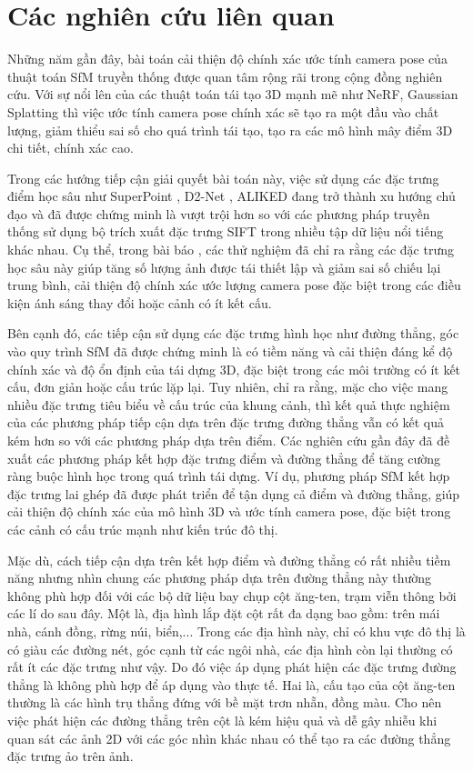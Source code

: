 \section{Các nghiên cứu liên quan}

Những năm gần đây, bài toán cải thiện độ chính xác ước tính camera pose của thuật toán SfM truyền thống được quan tâm rộng rãi trong cộng đồng nghiên cứu. Với sự nổi lên của các thuật toán tái tạo 3D mạnh mẽ như NeRF, Gaussian Splatting \cite{kerbl2023gaussian} thì việc ước tính camera pose chính xác sẽ tạo ra một đầu vào chất lượng, giảm thiểu sai số cho quá trình tái tạo, tạo ra các mô hình mây điểm 3D chi tiết, chính xác cao. 

Trong các hướng tiếp cận giải quyết bài toán này, việc sử dụng các đặc trưng điểm học sâu như SuperPoint \cite{detone2018superpoint}, D2-Net \cite{dusmanu2019d2}, ALIKED đang trở thành xu hướng chủ đạo và đã được chứng minh là vượt trội hơn so với các phương pháp truyền thống sử dụng bộ trích xuất đặc trưng SIFT trong nhiều tập dữ liệu nổi tiếng khác nhau. Cụ thể, trong bài báo \cite{geometryaware2024}, các thử nghiệm đã chỉ ra rằng các đặc trưng học sâu này giúp tăng số lượng ảnh được tái thiết lập và giảm sai số chiếu lại trung bình, cải thiện độ chính xác ước lượng camera pose đặc biệt trong các điều kiện ánh sáng thay đổi hoặc cảnh có ít kết cấu. 

Bên cạnh đó, các tiếp cận sử dụng các đặc trưng hình học như đường thẳng, góc vào quy trình SfM đã được chứng minh là có tiềm năng và cải thiện đáng kể độ chính xác và độ ổn định của tái dựng 3D, đặc biệt trong các môi trường có ít kết cấu, đơn giản hoặc cấu trúc lặp lại. Tuy nhiên, \cite{Liu_2023_CVPR} chỉ ra rằng, mặc cho việc mang nhiều đặc trưng tiêu biểu về cấu trúc của khung cảnh, thì kết quả thực nghiệm của các phương pháp tiếp cận dựa trên đặc trưng đường thẳng vẫn có kết quả kém hơn so với các phương pháp dựa trên điểm. Các nghiên cứu gần đây đã đề xuất các phương pháp kết hợp đặc trưng điểm và đường thẳng để tăng cường ràng buộc hình học trong quá trình tái dựng. Ví dụ, phương pháp SfM kết hợp đặc trưng lai ghép \cite{liu2024robust} đã được phát triển để tận dụng cả điểm và đường thẳng, giúp cải thiện độ chính xác của mô hình 3D và ước tính camera pose, đặc biệt trong các cảnh có cấu trúc mạnh như kiến trúc đô thị. 

Mặc dù, cách tiếp cận dựa trên kết hợp điểm và đường thẳng có rất nhiều tiềm năng nhưng nhìn chung các phương pháp dựa trên đường thẳng này thường không phù hợp đối với các bộ dữ liệu bay chụp cột ăng-ten, trạm viễn thông bởi các lí do sau đây. Một là, địa hình lắp đặt cột rất đa dạng bao gồm: trên mái nhà, cánh đồng, rừng núi, biển,... Trong các địa hình này, chỉ có khu vực đô thị là có giàu các đường nét, góc cạnh từ các ngôi nhà, các địa hình còn lại thường có rất ít các đặc trưng như vậy. Do đó việc áp dụng phát hiện các đặc trưng đường thẳng là không phù hợp để áp dụng vào thực tế. Hai là, cấu tạo của cột ăng-ten thường là các hình trụ thẳng đứng với bề mặt trơn nhẵn, đồng màu. Cho nên việc phát hiện các đường thẳng trên cột là kém hiệu quả và dễ gây nhiễu khi quan sát các ảnh 2D với các góc nhìn khác nhau có thể tạo ra các đường thẳng đặc trưng ảo trên ảnh.

